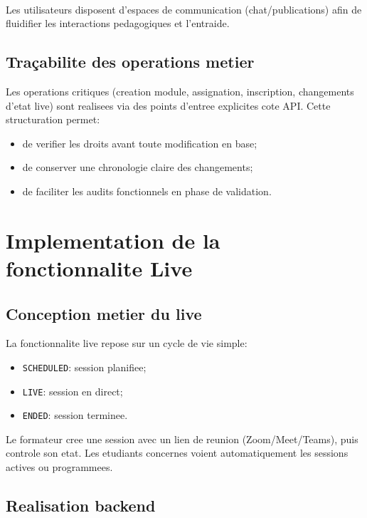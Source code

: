 ﻿﻿\documentclass[12pt,a4paper,oneside]{report}
\begin{document}
Les utilisateurs disposent d'espaces de communication (chat/publications) afin de fluidifier les interactions pedagogiques et l'entraide.

\subsection{Traçabilite des operations metier}

Les operations critiques (creation module, assignation, inscription, changements d'etat live) sont realisees via des points d'entree explicites cote API. Cette structuration permet:
\begin{itemize}
  \item de verifier les droits avant toute modification en base;
  \item de conserver une chronologie claire des changements;
  \item de faciliter les audits fonctionnels en phase de validation.
\end{itemize}

\section{Implementation de la fonctionnalite Live}

\subsection{Conception metier du live}

La fonctionnalite live repose sur un cycle de vie simple:
\begin{itemize}
  \item \texttt{SCHEDULED}: session planifiee;
  \item \texttt{LIVE}: session en direct;
  \item \texttt{ENDED}: session terminee.
\end{itemize}

Le formateur cree une session avec un lien de reunion (Zoom/Meet/Teams), puis controle son etat. Les etudiants concernes voient automatiquement les sessions actives ou programmees.

\subsection{Realisation backend}
\end{document}
